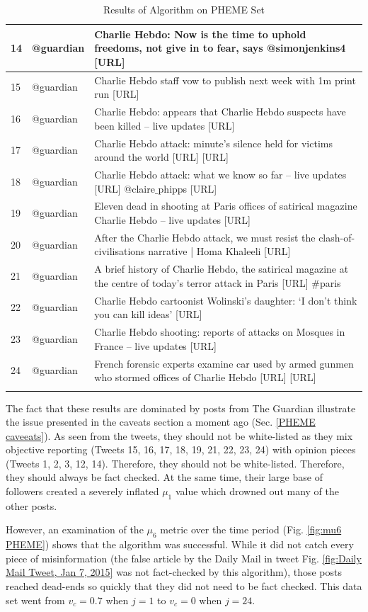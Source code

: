 \documentclass[preprint,review,12pt]{elsarticle}
\begin{document}
\begin{longtable}{ |p{0.5cm}|p{4.1cm}|p{12cm}|  }
\hline
14 & @guardian & Charlie Hebdo: Now is the time to uphold freedoms, not give in to fear, says @simonjenkins4 [URL]\\
\hline
15 & @guardian & Charlie Hebdo staff vow to publish next week with 1m print run [URL] \\
\hline
16 & @guardian & Charlie Hebdo: appears that Charlie Hebdo suspects have been killed – live updates [URL] \\
\hline
17 & @guardian &Charlie Hebdo attack: minute's silence held for victims around the world [URL] [URL] \\
\hline
18 & @guardian & Charlie Hebdo attack: what we know so far  – live updates [URL] @claire$\_$phipps [URL] \\
\hline
19 & @guardian & Eleven dead in shooting at Paris offices of satirical magazine Charlie Hebdo – live updates [URL] \\
\hline
20 & @guardian & After the Charlie Hebdo attack, we must resist the clash-of-civilisations narrative | Homa Khaleeli [URL] \\
\hline
21 & @guardian & A brief history of Charlie Hebdo, the satirical magazine at the centre of today's terror attack in Paris [URL] \#paris \\
\hline
22 & @guardian & Charlie Hebdo cartoonist Wolinski’s daughter: ‘I don’t think you can kill ideas’ [URL] \\
\hline
23 & @guardian & Charlie Hebdo shooting: reports of attacks on Mosques in France – live updates [URL] \\
\hline
24 & @guardian & French forensic experts examine car used by armed gunmen who stormed offices of Charlie Hebdo [URL] [URL] \\

\hline
\caption{Results of Algorithm on PHEME Set}
\label{Results of Algorithm PHEME}
\end{longtable}

The fact that these results are dominated by posts from The Guardian illustrate the issue presented in the caveats section a moment ago (Sec. \ref{PHEME caveeats}). As seen from the tweets, they should not be white-listed as they mix objective reporting (Tweets 15, 16, 17, 18, 19, 21, 22, 23, 24) with opinion pieces (Tweets 1, 2, 3, 12, 14). Therefore, they should not be white-listed. Therefore, they should always be fact checked. At the same time, their large base of followers created a severely inflated $\mu_1$ value which drowned out many of the other posts.

However, an examination of the $\mu_6$ metric over the time period (Fig. \ref{fig:mu6 PHEME}) shows that the algorithm was successful. While it did not catch every piece of misinformation (the false article by the Daily Mail in tweet Fig. \ref{fig:Daily Mail Tweet, Jan 7, 2015} was not fact-checked by this algorithm), those posts reached dead-ends so quickly that they did not need to be fact checked. This data set went from $v_c = 0.7$ when $j = 1$ to $v_c = 0$ when $j = 24$. 
\end{document}

